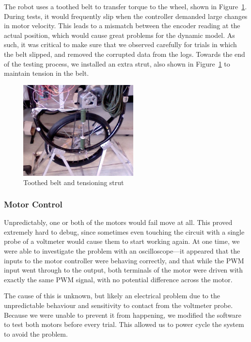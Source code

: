 \documentclass{IIBproject}
\begin{document}
The robot uses a toothed belt to transfer torque to the wheel, shown in
Figure~\ref{fig:fan_belt}. During tests, it would frequently slip when the
controller demanded large changes in motor velocity. This leads to a mismatch
between the encoder reading at the actual position, which would cause great
problems for the dynamic model. As such, it was critical to make sure that we
observed carefully for trials in which the belt slipped, and removed the
corrupted data from the logs. Towards the end of the testing process, we
installed an extra strut, also shown in Figure~\ref{fig:fan_belt} to maintain
tension in the belt.

\begin{figure}[htpb]
  \begin{center}
    \includegraphics[width=6cm]{fan_belt.jpg}
    \end{center}
    \caption{Toothed belt and tensioning strut}
    \label{fig:fan_belt}
    \end{figure}

\subsubsection{Motor Control}

Unpredictably, one or both of the motors would fail move at all. This proved
extremely hard to debug, since sometimes even touching the circuit with a
single probe of a voltmeter would cause them to start working again. At one
time, we were able to investigate the problem with an oscilloscope---it
appeared that the inputs to the motor controller were behaving correctly, and
that while the PWM input went through to the output, both terminals of the
motor were driven with exactly the same PWM signal, with no potential
difference across the motor.

The cause of this is unknown, but likely an electrical problem due to the
unpredictable behaviour and sensitivity to contact from the voltmeter probe.
Because we were unable to prevent it from happening, we modified the software
to test both motors before every trial. This allowed us to power cycle the
system to avoid the problem.
\end{document}
